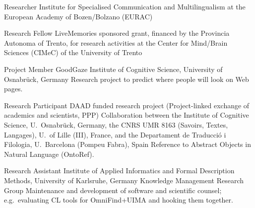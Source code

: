 
        {Researcher}
        {Institute for Specialised Communication and Multilingualism at the
        European Academy of Bozen/Bolzano (EURAC)}
        {}{}{}

        {Research Fellow}
        {LiveMemories sponsored grant, financed by the Provincia Autonoma of
        Trento, for research activities at the Center for Mind/Brain Sciences
        (CIMeC) of the University of Trento}
        {}{}{}


        {Project Member}
        {GoodGaze}
        {Institute of Cognitive Science, University of Osnabrück, Germany}
        {}
        {Research project to predict where people will look on Web pages.}


        {Research Participant}
        {DAAD funded research project (Project-linked exchange of academics and
        scientists, PPP)}
        {Collaboration between the Institute of Cognitive Science,
        U.~Osnabr\"{u}ck, Germany, the CNRS UMR 8163 (Savoirs, Textes,
        Langages), U.~of Lille (III), France, and the Departament de
        Traducci\'{o} i Filologia, U.~Barcelona (Pompeu Fabra), Spain}
        {}
        {Reference to Abstract Objects in Natural Language
        (OntoRef).}

        {Research Assistant}
        {}
        {Institute of Applied Informatics and Formal Description Methods,
        University of Karlsruhe, Germany} 
        {Knowledge Management Research Group}
        {Maintenance and development of software and scientific counsel;
        e.g.~evaluating CL tools for OmniFind+UIMA and hooking them together.}

